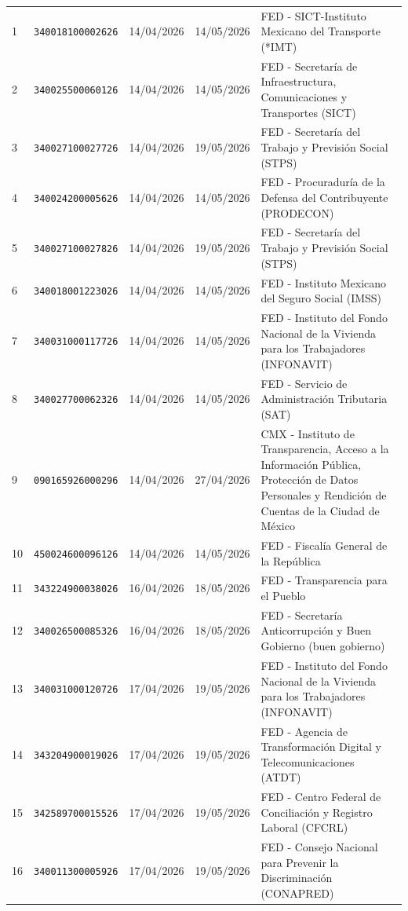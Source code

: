 \documentclass[11pt,letterpaper]{article}
\begin{document}
\begin{longtable}{C{0.7cm} L{3.15cm} C{2.05cm} C{2.05cm} L{8.55cm}}
1 & \texttt{340018100002626} & 14/04/2026 & 14/05/2026 & FED - SICT-Instituto Mexicano del Transporte (*IMT) \\
2 & \texttt{340025500060126} & 14/04/2026 & 14/05/2026 & FED - Secretaría de Infraestructura, Comunicaciones y Transportes (SICT) \\
3 & \texttt{340027100027726} & 14/04/2026 & 19/05/2026 & FED - Secretaría del Trabajo y Previsión Social (STPS) \\
4 & \texttt{340024200005626} & 14/04/2026 & 14/05/2026 & FED - Procuraduría de la Defensa del Contribuyente (PRODECON) \\
5 & \texttt{340027100027826} & 14/04/2026 & 19/05/2026 & FED - Secretaría del Trabajo y Previsión Social (STPS) \\
6 & \texttt{340018001223026} & 14/04/2026 & 14/05/2026 & FED - Instituto Mexicano del Seguro Social (IMSS) \\
7 & \texttt{340031000117726} & 14/04/2026 & 14/05/2026 & FED - Instituto del Fondo Nacional de la Vivienda para los Trabajadores (INFONAVIT) \\
8 & \texttt{340027700062326} & 14/04/2026 & 14/05/2026 & FED - Servicio de Administración Tributaria (SAT) \\
9 & \texttt{090165926000296} & 14/04/2026 & 27/04/2026 & CMX - Instituto de Transparencia, Acceso a la Información Pública, Protección de Datos Personales y Rendición de Cuentas de la Ciudad de México \\
10 & \texttt{450024600096126} & 14/04/2026 & 14/05/2026 & FED - Fiscalía General de la República \\
11 & \texttt{343224900038026} & 16/04/2026 & 18/05/2026 & FED - Transparencia para el Pueblo \\
12 & \texttt{340026500085326} & 16/04/2026 & 18/05/2026 & FED - Secretaría Anticorrupción y  Buen Gobierno (buen gobierno) \\
13 & \texttt{340031000120726} & 17/04/2026 & 19/05/2026 & FED - Instituto del Fondo Nacional de la Vivienda para los Trabajadores (INFONAVIT) \\
14 & \texttt{343204900019026} & 17/04/2026 & 19/05/2026 & FED - Agencia de Transformación Digital y Telecomunicaciones (ATDT) \\
15 & \texttt{342589700015526} & 17/04/2026 & 19/05/2026 & FED - Centro Federal de Conciliación y Registro Laboral (CFCRL) \\
16 & \texttt{340011300005926} & 17/04/2026 & 19/05/2026 & FED - Consejo Nacional para Prevenir la Discriminación (CONAPRED) \\

\end{longtable}
\end{document}
